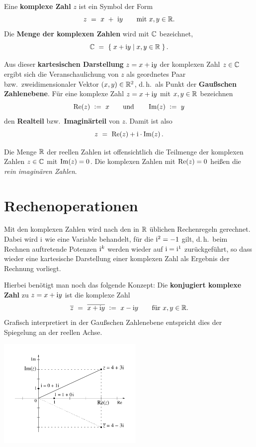 Eine \textbf{komplexe Zahl} $z$ ist ein Symbol der Form
\begin{equation}
\label{eq:KartesischeForm}
z
\ =\ x\ +\ \mathrm{i} y
\qquad
\text{mit $x,y\in\mathbb{R}$}.
\end{equation}
Die \textbf{Menge der komplexen Zahlen} wird mit $\mathbb{C}$ bezeichnet,
\[
\mathbb{C}
\ =\ \{\;x+\mathrm{i} y\;|\;x,y\in\mathbb{R}\;\}
\,.
\]

\noindent Aus dieser \textbf{kartesischen Darstellung} $z=x+\mathrm{i} y$ der komplexen Zahl
$z\in\mathbb{C}$ ergibt sich die Veranschaulichung von $z$ als geordnetes Paar
bzw.\ zweidimensionaler Vektor $(x,y)\in\mathbb{R}^2$, d.\,h.\ als Punkt der
\textbf{Gaußschen Zahlenebene}.
\newline
\noindent Für eine komplexe Zahl $z=x+\mathrm{i} y$ mit $x,y\in\mathbb{R}$ bezeichnen
\[
\operatorname{Re}(z)
\ \mathrel{\mathop:}=\ x
\qquad\text{und}\qquad
\operatorname{Im}(z)
\ \mathrel{\mathop:}=\ y
\]
den \textbf{Realteil} bzw.\ \textbf{Imaginärteil} von $z$. Damit ist also
\[
z
\ =\ \operatorname{Re}(z)+\mathrm{i}\cdot\operatorname{Im}(z)
\,.
\]

\noindent Die Menge $\mathbb{R}$ der reellen Zahlen ist offensichtlich die Teilmenge der
komplexen Zahlen $z\in\mathbb{C}$ mit $\operatorname{Im}(z)=0$. Die komplexen Zahlen mit
$\operatorname{Re}(z)=0$ heißen die \emph{rein imaginären Zahlen}.

\section{Rechenoperationen}

Mit den komplexen Zahlen wird nach den in $\mathbb{R}$ üblichen Rechenregeln
gerechnet. Dabei wird $\mathrm{i}$ wie eine Variable behandelt, für die
$\mathrm{i}^2=-1$ gilt, d.\,h.\ beim Rechnen auftretende Potenzen $\mathrm{i}^k$ werden
wieder auf $\mathrm{i}=\mathrm{i}^1$ zurückgeführt, so dass wieder eine kartesische
Darstellung einer komplexen Zahl als Ergebnis der Rechnung vorliegt.

\noindent Hierbei benötigt man noch das folgende Konzept: Die \textbf{konjugiert komplexe Zahl} zu $z=x+\mathrm{i} y$ ist die komplexe Zahl
\[
\overline{z}
\ =\ \overline{x+\mathrm{i} y}
\ \mathrel{\mathop:}=\ x-\mathrm{i} y
\qquad
\text{für $x,y\in\mathbb{R}$}.
\]
Grafisch interpretiert in der Gaußschen Zahlenebene entspricht dies der
Spiegelung an der reellen Achse.

\centerline{\includegraphics[width=7cm]{img/complex1}}

